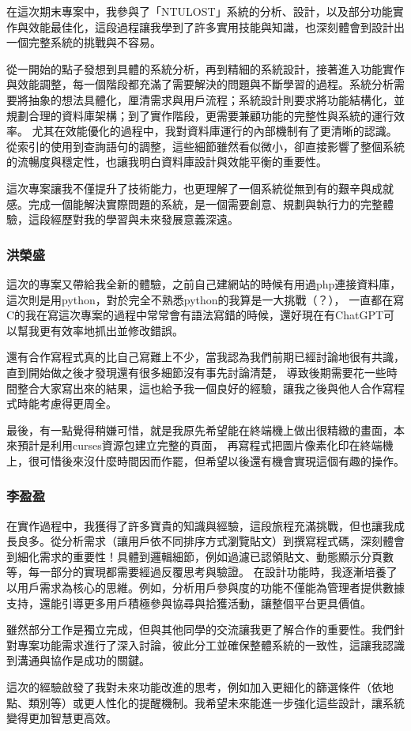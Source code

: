 \documentclass[12pt,a4paper]{article}
\begin{document}
在這次期末專案中，我參與了「NTULOST」系統的分析、設計，以及部分功能實作與效能最佳化，這段過程讓我學到了許多實用技能與知識，也深刻體會到設計出一個完整系統的挑戰與不容易。

從一開始的點子發想到具體的系統分析，再到精細的系統設計，接著進入功能實作與效能調整，每一個階段都充滿了需要解決的問題與不斷學習的過程。系統分析需要將抽象的想法具體化，厘清需求與用戶流程；系統設計則要求將功能結構化，並規劃合理的資料庫架構；到了實作階段，更需要兼顧功能的完整性與系統的運行效率。
尤其在效能優化的過程中，我對資料庫運行的內部機制有了更清晰的認識。從索引的使用到查詢語句的調整，這些細節雖然看似微小，卻直接影響了整個系統的流暢度與穩定性，也讓我明白資料庫設計與效能平衡的重要性。

這次專案讓我不僅提升了技術能力，也更理解了一個系統從無到有的艱辛與成就感。完成一個能解決實際問題的系統，是一個需要創意、規劃與執行力的完整體驗，這段經歷對我的學習與未來發展意義深遠。


\subsubsection*{洪榮盛}

這次的專案又帶給我全新的體驗，之前自己建網站的時候有用過php連接資料庫，這次則是用python，對於完全不熟悉python的我算是一大挑戰（？），
一直都在寫C的我在寫這次專案的過程中常常會有語法寫錯的時候，還好現在有ChatGPT可以幫我更有效率地抓出並修改錯誤。

還有合作寫程式真的比自己寫難上不少，當我認為我們前期已經討論地很有共識，直到開始做之後才發現還有很多細節沒有事先討論清楚，
導致後期需要花一些時間整合大家寫出來的結果，這也給予我一個良好的經驗，讓我之後與他人合作寫程式時能考慮得更周全。

最後，有一點覺得稍嫌可惜，就是我原先希望能在終端機上做出很精緻的畫面，本來預計是利用curses資源包建立完整的頁面，
再寫程式把圖片像素化印在終端機上，很可惜後來沒什麼時間因而作罷，但希望以後還有機會實現這個有趣的操作。

\subsubsection*{李盈盈}

在實作過程中，我獲得了許多寶貴的知識與經驗，這段旅程充滿挑戰，但也讓我成長良多。從分析需求（讓用戶依不同排序方式瀏覽貼文）到撰寫程式碼，深刻體會到細化需求的重要性！具體到邏輯細節，例如過濾已認領貼文、動態顯示分頁數等，每一部分的實現都需要經過反覆思考與驗證。
在設計功能時，我逐漸培養了以用戶需求為核心的思維。例如，分析用戶參與度的功能不僅能為管理者提供數據支持，還能引導更多用戶積極參與協尋與拾獲活動，讓整個平台更具價值。

雖然部分工作是獨立完成，但與其他同學的交流讓我更了解合作的重要性。我們針對專案功能需求進行了深入討論，彼此分工並確保整體系統的一致性，這讓我認識到溝通與協作是成功的關鍵。

這次的經驗啟發了我對未來功能改進的思考，例如加入更細化的篩選條件（依地點、類別等）或更人性化的提醒機制。我希望未來能進一步強化這些設計，讓系統變得更加智慧更高效。
\end{document}
